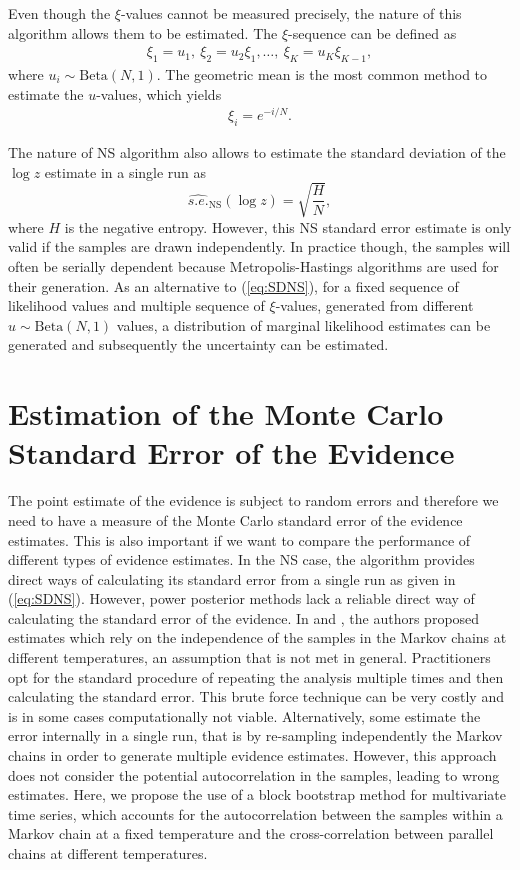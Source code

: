 \documentclass[aps,reprint,amsmath,amssymb,showpacs,showkeys]{revtex4-1}%
\begin{document}
Even though the $\xi$-values cannot be measured precisely, the nature of this algorithm allows them to be estimated. 
The $\xi$-sequence can be defined as 
\begin{align*}
\xi_1 = u_1,\: \xi_2 = u_2 \xi_1, \dots,\: \xi_K = u_K \xi_{K-1},
\end{align*}
where $u_i\sim\text{Beta}(N,1)$.  The geometric mean is the most common method to estimate the $u$-values, which yields
\begin{align*}
\xi_i = e^{-i/N}.
\end{align*}

The nature of NS algorithm also allows to estimate the standard deviation of the $\log z$ estimate in a single run as 
\begin{equation}\label{eq:SDNS}
\widehat{s.e.}_{\text{NS}}(\log z) = \sqrt{\dfrac{H}{N}},
\end{equation}
where $H$ is the negative entropy.  However, this NS standard error estimate is only valid if the samples are drawn independently. In practice though, the samples will often be serially dependent because Metropolis-Hastings algorithms are  used for their generation. As an alternative to (\ref{eq:SDNS}), for a fixed sequence of likelihood values and multiple sequence of $\xi$-values, generated from different  $u\!\sim\!\text{Beta}(N,1)$ values, a distribution of marginal likelihood estimates can be generated and subsequently the uncertainty can be estimated. 
\bigskip


\section{Estimation of the Monte Carlo Standard Error of the Evidence}
The point estimate of the evidence is subject to random errors and therefore we need 
 to have a measure of the Monte Carlo standard error of the evidence estimates.  This is also important if we want to compare the  performance of different types of evidence estimates.  In the NS case, the algorithm provides direct ways of calculating its standard error from  a single run as given in (\ref{eq:SDNS}).  However, power posterior methods lack a reliable direct way of calculating the standard error of the evidence.  In \cite{Lartillot:Philippe:2006} and \cite{Xie:Lewis:Fan:Kuo:Chen:2011}, the authors proposed estimates which rely on the  independence of the samples in the Markov chains at different temperatures, an assumption that is not met  in general.  Practitioners opt for the standard procedure of repeating the analysis multiple times and then calculating the standard error.  This brute force technique can be very costly and is in some cases computationally not viable.  Alternatively, some estimate the error internally in a single run, that is by re-sampling independently the Markov chains in order to generate multiple evidence estimates.  However, this approach does not consider the potential autocorrelation in the samples, leading to wrong estimates.  Here, we propose the use of a block bootstrap method for multivariate time series, which accounts for  the autocorrelation between the samples within a Markov chain at a fixed
temperature and the cross-correlation between parallel chains at different temperatures.
	
\end{document}
